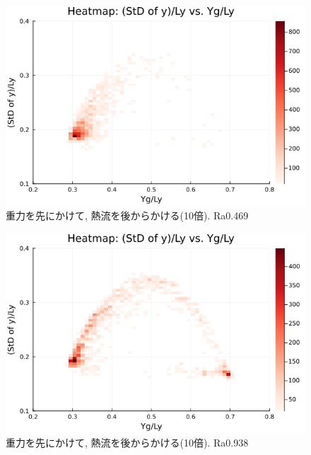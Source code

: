 
\begin{figure}[H]
  \centering
  \includegraphics[scale=0.6]{image/qrs10_drop_heat/2023-12-28T10:59:29.242_qrs_gap_chi1.265_Ay50_rho0.4_T0.43_dT0.04_Rd0.0_Rt0.375_Ra0.4693845_g0.0003999718779659611_run4.0e8.png}
  \caption{重力を先にかけて, 熱流を後からかける(10倍). Ra0.469}
  \label{}
\end{figure} 

\begin{figure}[H]
  \centering
  \includegraphics[scale=0.6]{image/qrs10_drop_heat/2023-12-28T10:59:29.748_qrs_gap_chi1.265_Ay50_rho0.4_T0.43_dT0.04_Rd0.0_Rt0.375_Ra0.938769_g0.0003999718779659611_run4.0e8.png}
  \caption{重力を先にかけて, 熱流を後からかける(10倍). Ra0.938}
  \label{}
\end{figure} 


